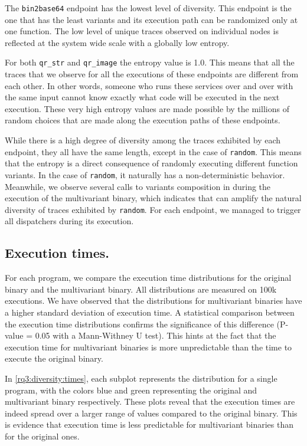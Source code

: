 The \texttt{bin2base64} endpoint has the lowest level of diversity. This endpoint is the one that has the least variants and its execution path can be randomized only at one function. The low level of unique traces observed on individual nodes is reflected at the system wide scale with a globally low entropy.

For both  \texttt{qr\_str} and \texttt{qr\_image} the entropy value is 1.0. This means that all the traces that we observe for all the executions of these endpoints are different from each other. In other words, someone who runs these services over and over with the same input cannot know exactly what code will be executed in the next execution.
These very high entropy values are made possible by the millions of random choices that are made along the execution paths of these endpoints.


While there is a high degree of diversity among the traces exhibited by each endpoint, they all have the same length, except in the case of  \texttt{random}.
This means that the entropy is a direct consequence of randomly executing different function variants.
In the case of \texttt{random}, it naturally has a non-deterministic behavior.
Meanwhile, we observe several calls to variants composition in during the execution of the multivariant binary, which indicates that \tool can amplify the natural diversity of traces exhibited by \texttt{random}. 
For each endpoint, we managed to trigger all dispatchers during its execution.


\subsection*{Execution times.}

For each program, we compare the execution time distributions for the original binary and the multivariant binary. All distributions are measured on 100k executions.
We have observed that the distributions for multivariant binaries  have a higher standard deviation of execution time.
A statistical comparison between the execution time distributions confirms the significance of this difference (P-value = 0.05 with a  Mann-Withney U test). This hints at the fact that  the execution time for multivariant binaries is more unpredictable than the time to execute the original binary. 

In \autoref{rq3:diversity:times}, each subplot represents the distribution for a single program, with the colors blue and green representing the original and multivariant binary respectively. These plots reveal  that the execution times are indeed spread over a larger range of values compared to the original binary. 
This is evidence that execution time is less predictable for multivariant binaries than for the original ones.

